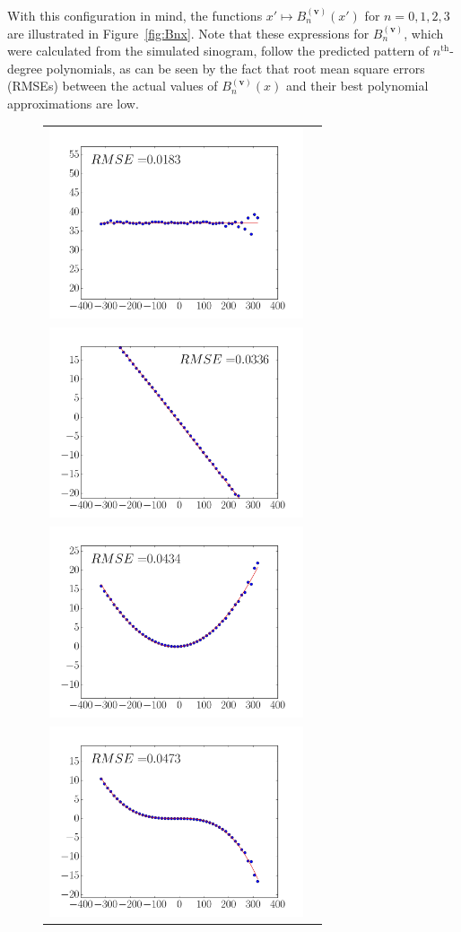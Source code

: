 \documentclass[twocolumn]{IEEEtran}
\newcommand{\bv}{\mathbf{v}}
\newcommand{\Bnv}{B_n^{(\bv)}}
\begin{document}
With this configuration in mind, the functions $x' \mapsto \Bnv(x')$ for $n = 0,1,2,3$ are illustrated in Figure~\ref{fig:Bnx}. Note that these expressions for $\Bnv$, which were calculated from the simulated sinogram, follow the predicted pattern of $n^{\textrm{th}}$-degree polynomials, as can be seen by the fact that root mean square errors (RMSEs) between the actual values of $\Bnv(x)$ and their best polynomial approximations are low.
\begin{figure}
	\centering
	\begin{tabular}{cc}
	\includegraphics[width=75mm]{figs/B0.png} \\
	\includegraphics[width=75mm]{figs/B1.png} \\
	\includegraphics[width=75mm]{figs/B2.png} \\
	\includegraphics[width=75mm]{figs/B3.png} 

\end{tabular}
\end{figure}
\end{document}

